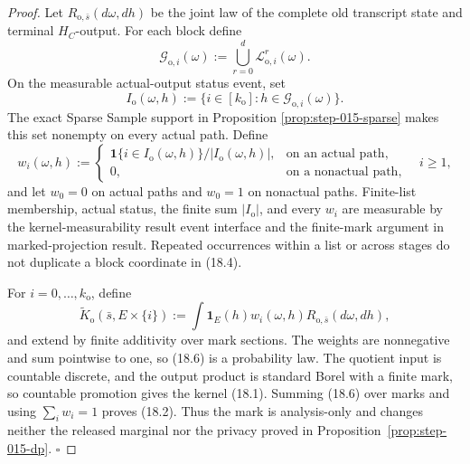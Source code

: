 \begin{proof}
Let \(R_{\mathrm o,\bar s}(d\omega,dh)\) be the joint law of the complete
old transcript state and terminal \(H_C\)-output. For each block define
\[
\mathcal G_{\mathrm o,i}(\omega):=
\bigcup_{r=0}^d\mathcal L_{\mathrm o,i}^r(\omega).
\tag{18.3}
\]
On the measurable actual-output status event, set
\[
I_{\mathrm o}(\omega,h):=
\{i\in[k_{\mathrm o}]:h\in\mathcal G_{\mathrm o,i}(\omega)\}.
\tag{18.4}
\]
The exact Sparse Sample support in Proposition
\ref{prop:step-015-sparse} makes this set nonempty on every actual path.
Define
\[
w_i(\omega,h):=
\begin{cases}
\mathbf1\{i\in I_{\mathrm o}(\omega,h)\}/|I_{\mathrm o}(\omega,h)|,
&\text{on an actual path},\\
0,&\text{on a nonactual path},
\end{cases}
\quad i\ge1,
\tag{18.5}
\]
and let \(w_0=0\) on actual paths and \(w_0=1\) on nonactual paths.
Finite-list membership, actual status, the finite sum
\(|I_{\mathrm o}|\), and every \(w_i\) are measurable by the 
kernel-measurability result event interface and the finite-mark argument  in marked-projection result.
Repeated occurrences within a list or across stages do not duplicate a
block coordinate in (18.4).

For \(i=0,\ldots,k_{\mathrm o}\), define
\[
\widetilde K_{\mathrm o}(\bar s,E\times\{i\})
:=\int\mathbf1_E(h)w_i(\omega,h)
R_{\mathrm o,\bar s}(d\omega,dh),
\tag{18.6}
\]
and extend by finite additivity over mark sections. The weights are
nonnegative and sum pointwise to one, so (18.6) is a probability law.
The quotient input is countable discrete, and the output product is
standard Borel with a finite mark, so  countable promotion gives
the kernel (18.1). Summing (18.6) over marks and using
\(\sum_iw_i=1\) proves (18.2). Thus the mark is analysis-only and changes
neither the released marginal nor the privacy proved in
Proposition~\ref{prop:step-015-dp}. \(\square\)


\end{proof}

